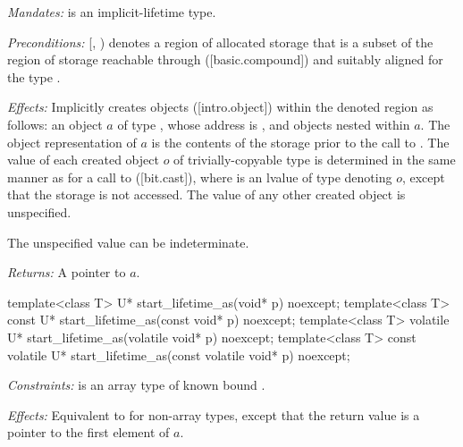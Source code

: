 \begin{adjustwidth}{0.5cm}{0.5cm}

\emph{Mandates:}  is an implicit-lifetime type.

\emph{Preconditions:} [, ) denotes a region of allocated storage that is a subset of the region of storage reachable through ([basic.compound])  and suitably aligned for the type .

\emph{Effects:} Implicitly creates objects ([intro.object]) within the denoted region as follows: an object $a$ of type , whose address is , and objects nested within $a$. The object representation of $a$ is the contents of the storage prior to the call to . The value of each created object $o$ of trivially-copyable type  is determined in the same manner as for a call to  ([bit.cast]), where  is an lvalue of type  denoting $o$, except that the storage is not accessed. The value of any other created object is unspecified. \begin{note}The unspecified value can be indeterminate.\end{note}

\emph{Returns:} A pointer to $a$.
\end{adjustwidth}

\begin{addedblock}
\begin{codeblock}
template<class T>
  U* start_lifetime_as(void* p) noexcept;
template<class T>
  const U* start_lifetime_as(const void* p) noexcept;
template<class T>
  volatile U* start_lifetime_as(volatile void* p) noexcept;
template<class T>
  const volatile U* start_lifetime_as(const volatile void* p) noexcept;
\end{codeblock}

\begin{adjustwidth}{0.5cm}{0.5cm}

\emph{Constraints:}  is an array type of known bound .

\emph{Effects:} Equivalent to  for non-array types, except that the return value is a pointer to the first element of $a$.
\end{adjustwidth}
\end{addedblock}

